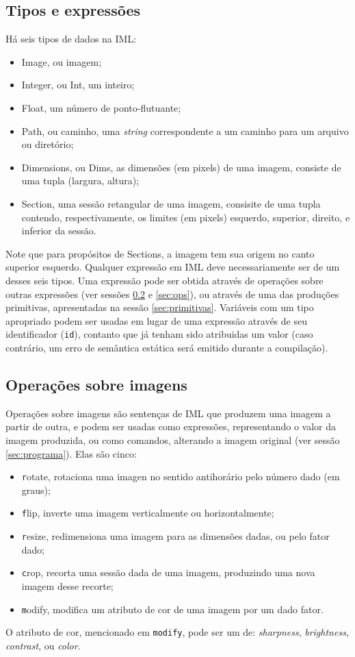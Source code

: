 \documentclass{article}
\begin{document}
\subsection{Tipos e expressões}
\label{sec:tipos}
Há seis tipos de dados na IML:
\begin{itemize}
\item Image, ou imagem;
\item Integer, ou Int, um inteiro;
\item Float, um número de ponto-flutuante;
\item Path, ou caminho, uma \textit{string} correspondente a um caminho para um arquivo ou diretório;
\item Dimensions, ou Dims, as dimensões (em pixels) de uma imagem, consiste de uma tupla (largura, altura);
\item Section, uma sessão retangular de uma imagem, consisite de uma tupla contendo, respectivamente, os limites (em pixels) esquerdo, superior, direito, e inferior da sessão.
\end{itemize}
Note que para propósitos de Sections, a imagem tem sua origem no canto superior esquerdo. Qualquer expressão em IML deve necessariamente ser de um desses seis tipos. Uma expressão pode ser obtida através de operações sobre outras expressões (ver sessões \ref{sec:imgops} e \ref{sec:ops}), ou através de uma das produções primitivas, apresentadas na sessão \ref{sec:primitivas}. Variáveis com um tipo apropriado podem ser usadas em lugar de uma expressão através de seu identificador (\texttt{id}), contanto que já tenham sido atribuidas um valor (caso contrário, um erro de semântica estática será emitido durante a compilação). 

\subsection{Operações sobre imagens}
\label{sec:imgops}
Operações sobre imagens são sentenças de IML que produzem uma imagem a partir de outra, e podem ser usadas como expressões, representando o valor da imagem produzida, ou como comandos, alterando a imagem original (ver sessão \ref{sec:programa}). Elas são cinco:
\begin{itemize}
\item \texttt rotate, rotaciona uma imagen no sentido antihorário pelo número dado (em graus);
\item \texttt flip, inverte uma imagem verticalmente ou horizontalmente;
\item \texttt resize, redimensiona uma imagem para as dimensões dadas, ou pelo fator dado;
\item \texttt crop, recorta uma sessão dada de uma imagem, produzindo uma nova imagem desse recorte;
\item \texttt modify, modifica um atributo de cor de uma imagem por um dado fator.
\end{itemize}
O atributo de cor, mencionado em \texttt{modify}, pode ser um de: \textit{sharpness}, \textit{brightness}, \textit{contrast}, ou \textit{color}.
\end{document}
